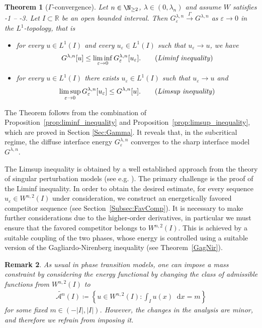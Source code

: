 \documentclass{article}
\newcommand{\dd}{\mathop{}\mathrm{d}} %
\newcommand{\lam}{\lambda}
\newcommand{\eps}{\varepsilon}
\numberwithin{figure}{section}
\def\AAA{{\mathcal A}} \def\calB{{\mathcal B}} \def\calC{{\mathcal C}}
\newcommand{\R}{\mathbb{R}}
\newtheorem{theorem}{Theorem}[section]
\newtheorem{rem}[theorem]{Remark}
\numberwithin{equation}{section}
\begin{document}
\begin{theorem}[$\Gamma$-convergence] \label{Gamma_conv_n}
Let $n \in \N_{\geq 2}$, $\lam \in (0,\lam_n)$ and assume $W$ satisfies \hyp1 -- \hyp3. Let $I \subset \R$ be an open bounded interval. Then $G_\eps^{\lam, n} \stackrel{\Gamma}{\longrightarrow} G^{\lam, n}$ as $\eps \to 0$ in the $L^1$-topology, that is 
    \begin{itemize}
        \item for every $u \in L^1(I)$ and every $u_\eps \in L^1(I)$ such that $u_\eps \to u$, we have
            \begin{align} \label{defliminf} 
                G^{\lam, n}[u] \leq \liminf_{\eps \to 0} G_\eps^{\lam, n}[u_\eps].  \tag{\textit{Liminf inequality}}
            \end{align}%
        \item for every $u \in L^1(I)$ there exists $u_\eps \in L^1(I)$ such that $u_\eps \to u$ and 
            \begin{align} \label{deflimsup}
                \limsup_{\eps \to 0} G_\eps^{\lam, n}[u_\eps] \leq G^{\lam, n}[u].  \tag{\textit{Limsup inequality}}
            \end{align}
    \end{itemize}
\end{theorem}
 

The Theorem follows from the combination of Proposition~\ref{prop:liminf_inequality} and Proposition~\ref{prop:limsup_inequality}, which are proved in Section \ref{Sec:Gamma}. It reveals that, in the subcritical regime, the diffuse interface energy $G_\eps^{\lam, n}$ converges to the sharp interface model $G^{\lam, n}$.

The Limsup inequality is obtained by a well established approach from the theory of singular perturbation models (see e.g. \cite{CicSpaZep,CheDalFonLeo,BruDonSol}). The primary challenge is the proof of the Liminf inequality. In order to obtain the desired estimate, for every sequence $u_\eps \in W^{n,2}(I)$ under consideration, we construct an energetically favored competitor sequence (see Section~\ref{Subsec:FavComp}). It is necessary to make further considerations due to the higher-order derivatives, in particular we must ensure that the favored competitor belongs to $W^{n,2}(I)$. This is achieved by a suitable coupling of the two phases, whose energy is controlled using a suitable version of the Gagliardo-Nirenberg inequality (see Theorem~\ref{GagNir}).

\begin{rem}
As usual in phase transition models, one can impose a mass constraint by considering the energy functional by changing the class of admissible functions from $W^{n,2}(I)$ to
    \begin{align}
        \tilde{\AAA^n}(I) \coloneqq \left\{u \in W^{n,2}(I) : \int_I u(x) \dd x = m \right\}
    \end{align}
for some fixed $m \in (-|I|,|I|)$. However, the changes in the analysis are minor, and therefore we refrain from imposing it.
\end{rem}
\end{document}
